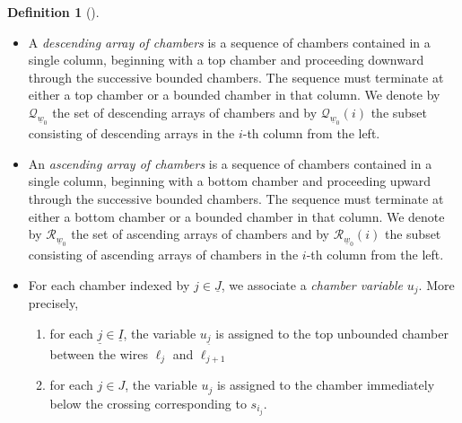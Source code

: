 \documentclass[11pt]{amsart}
\theoremstyle{plain}
\theoremstyle{definition}
\newtheorem{definition}[theorem]{Definition}
\theoremstyle{remark}
\numberwithin{equation}{section} \numberwithin{table}{section}
\numberwithin{equation}{section}
\begin{document}
\begin{definition}[{\cite[Section 5.1]{GP00}}]
\begin{itemize}
\begin{figure}[h]
\begin{center}
\end{center}
\caption{\label{figure_avoiding} Forbidden fragments.}
\end{figure}
\item A \emph{descending array of chambers} is a sequence of chambers contained in a single column, beginning with a top chamber and proceeding downward through the successive bounded chambers. The sequence must terminate at either a top chamber or a bounded chamber in that column. We denote by $\mathcal{Q}_{\underline{w}_0}$ the set of descending arrays of chambers and by $\mathcal{Q}_{\underline{w}_0}(i)$ the subset consisting of descending arrays in the $i$-th column from the left.
\item An \emph{ascending array of chambers} is a sequence of chambers contained in a single column, beginning with a bottom chamber and proceeding upward through the successive bounded chambers. The sequence must terminate at either a bottom chamber or a bounded chamber in that column. We denote by $\mathcal{R}_{\underline{w}_0}$ the set of ascending arrays of chambers and by $\mathcal{R}_{\underline{w}_0}(i)$ the subset consisting of ascending arrays of chambers in the $i$-th column from the left.
\item For each chamber indexed by $j \in \underline{J}$, we associate a \emph{chamber variable} $u_j$. More precisely,
\begin{enumerate}
\item for each $\underline{j} \in \underline{I}$, the variable $u_{\underline{j}}$ is assigned to the top unbounded chamber between the wires $\ell_j$ and $\ell_{j+1}$
\item for each $j \in J$, the variable $u_j$ is assigned to the chamber immediately below the crossing corresponding to $s_{i_j}$.
\end{enumerate}
\end{itemize}
\end{definition}
\end{document}
